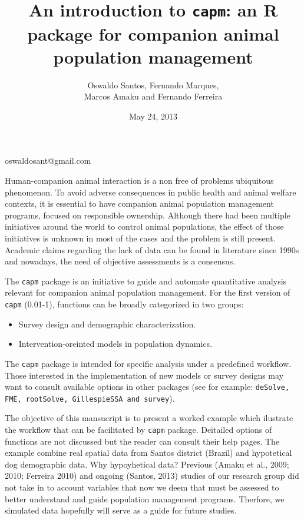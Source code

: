 \documentclass[a4paper]{article}
\begin{document}

\setlength{\parskip}{.5cm}
\title{An introduction to \texttt{capm}: an R package for companion animal population management}
\author{Oswaldo Santos, Fernando Marques,\\ Marcos Amaku and Fernando Ferreira}
\date{May 24, 2013}
\maketitle 
\begin{center}
oswaldosant@gmail.com
\end{center}

Human-companion animal interaction is a non free of problems ubiquitous phenomenon. To avoid adverse consequences in public health and animal welfare contexts, it is essential to have companion animal population management programs, focused on responsible ownership. Although there had been multiple initiatives around the world to control animal populations, the effect of those initiatives is unknown in most of the cases and the problem is still present. Academic claims regarding the lack of data can be found in literature since 1990s and nowadays, the need of objective assessments is a consensus. 

The \texttt{capm} package is an initiative to guide and automate quantitative analysis relevant for companion animal population management. For the first version of \texttt{capm} (0.01-1), functions can be broadly categorized in two groups:\\
\begin{itemize}
\item Survey design and demographic characterization.
\item Intervention-oreinted models in population dynamics.
\end{itemize}

The \texttt{capm} package is intended for specific analysis under a predefined workflow. Those interested in the implementation of new models or survey designs may want to consult available options in other packages (see for example: \texttt{deSolve, FME, rootSolve, GillespieSSA and survey}).

The objective of this mansucript is to present a worked example which ilustrate the workflow that can be facilitated by \texttt{capm} package. Deitailed options of functions are not discussed but the reader can consult their help pages. The example combine real spatial data from Santos district (Brazil) and hypotetical dog demographic data. Why hypoyhetical data? Previous (Amaku et al., 2009; 2010; Ferreira 2010) and ongoing (Santos, 2013) studies of our research group did not take in to account variables that now we deem that must be assessed to better understand and guide population management programs. Therfore, we simulated data hopefully will serve as a guide for future studies. 
\end{document}
